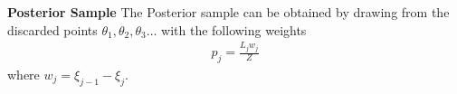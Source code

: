 \begin{frame}{\small{\textbf{Posterior Sample}}}
The Posterior sample can be obtained by drawing from the discarded points $\theta_1,\theta_2,\theta_3 \ldots$ with the following weights
\begin{align*}
p_{j} = \frac{L_{j} w_{j}}{Z} 
\end{align*}
where $w_{j}=\xi_{j-1} - \xi_{j}$.
\\~\\
\end{frame}


